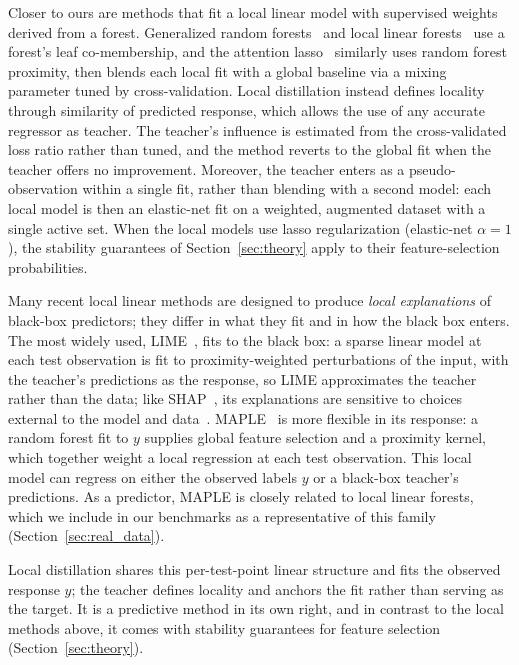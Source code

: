 \documentclass[12pt]{article}
\theoremstyle{definition}
\begin{document}
Closer to ours are methods that fit a local linear model with supervised weights derived from a forest. Generalized random forests~\cite{athey2019generalized} and local linear forests~\cite{friedberg2020local} use a forest's leaf co-membership, and the attention lasso~\cite{craig2025supervised} similarly uses random forest proximity, then blends each local fit with a global baseline via a mixing parameter tuned by cross-validation. 
Local distillation instead defines locality through similarity of predicted response, which allows the use of any accurate regressor as teacher. 
The teacher's influence is estimated from the cross-validated loss ratio rather than tuned, and the method reverts to the global fit when the teacher offers no improvement. 
Moreover, the teacher enters as a pseudo-observation within a single fit, rather than blending with a second model: each local model is then an elastic-net fit on a weighted, augmented dataset with a single active set. 
When the local models use lasso regularization (elastic-net $\alpha = 1$), the stability guarantees of Section~\ref{sec:theory} apply to their feature-selection probabilities.

Many recent local linear methods are designed to produce \textit{local explanations} of black-box predictors; they differ in what they fit and in how the black box enters. 
The most widely used, LIME~\cite{ribeiro2016lime}, fits to the black box: a sparse linear model at each test observation is fit to proximity-weighted perturbations of the input, with the teacher's predictions as the response, so LIME approximates the teacher rather than the data; like SHAP~\cite{lundberg2017unified}, its explanations are sensitive to choices external to the model and data~\cite{garreau2020explaining, slack2020fooling, kumar2020problems, aas2021explaining}.
MAPLE~\cite{plumb2018model} is more flexible in its response: a random forest fit to $y$ supplies global feature selection and a proximity kernel, which together weight a local regression at each test observation. 
This local model can regress on either the observed labels $y$ or a black-box teacher's predictions.
As a predictor, MAPLE is closely related to local linear forests, which we include in our benchmarks as a representative of this family (Section~\ref{sec:real_data}).

Local distillation shares this per-test-point linear structure and fits the observed response $y$; the teacher defines locality and anchors the fit rather than serving as the target.
It is a predictive method in its own right, and in contrast to the local methods above, it comes with stability guarantees for feature selection (Section~\ref{sec:theory}).
\end{document}
